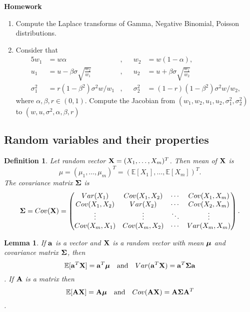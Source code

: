 \documentclass[11pt]{article}
\def\A{{\bf A}}
\def\a{{\bf a}}
\def\X{{\bf X}}
\def\BE{{\mathbb E}}
\def\muu{\mbox{\boldmath$\mu$\unboldmath}}
\def\Si{\mbox{\boldmath$\Sigma$\unboldmath}}
\newtheorem{lemma}{Lemma}[section]
\newtheorem{definition}{Definition}[section]
\begin{document}
{\bf Homework}
\begin{enumerate}
	\item Compute the Laplace transforms of Gamma, Negative Binomial, Poisson distributions.
	\item Consider that
		\begin{alignat*}{5}
			w_1		&= w\alpha					&, && w_2 &=w(1-\alpha),\\
			u_1		&= u-\beta\sigma\sqrt{\frac{w_2}{w_1}}	&, && u_2 &=  u+\beta\sigma\sqrt{\frac{w_1}{w_2}}\\
			\sigma_1^2 &= r(1-\beta^2)\sigma^2w/w_1	&, && \sigma_2^2 &= (1-r)(1-\beta^2)\sigma^2w/w_2,
		\end{alignat*}
		where $\alpha,\beta,r\in(0,1)$.
		Compute the Jacobian from $(w_1,w_2,u_1,u_2,\sigma_1^2,\sigma_2^2)$ to $(w,u,\sigma^2,\alpha,\beta,r)$
\end{enumerate}

\subsection{Random variables and their properties}

\begin{definition}
	Let random vector $\X=(X_1,\dots,X_m)^T$. Then mean of $\X$ is 
		$$\mu=(\mu_1,\dots,\mu_m)^T=(\BE[X_1],\dots,\BE[X_m])^T.$$
	The covariance matrix $\Si$ is
		$$\Si = Cov(\X) = 
			\begin{pmatrix}
				Var(X_1)		& Cov(X_1,X_2)	& \cdots 	& Cov(X_1,X_m)\\
				Cov(X_1,X_2)	& Var(X_2)	 	& \cdots 	& Cov(X_2,X_m)\\	
				\vdots 		& \vdots 		& \ddots 	& \vdots\\
				Cov(X_m,X_1) 	& Cov(X_m,X_2)& \cdots 	& Var(X_m,X_m)
			\end{pmatrix}.
		$$
\end{definition}

\begin{lemma}
	If $\a$ is a vector and $\X$ is a random vector with mean $\muu$ and covariance matrix $\Si$, then
		$$\BE[\a^T\X]=\a^T\muu \quad \text{and} \quad Var(\a^T\X)=\a^T\Si\a$$.
	If $\A$ is a matrix then
		$$\BE[\A\X] = \A\muu  \quad \text{and} \quad Cov(\A\X) = \A\Si\A^T$$.
\end{lemma}
\end{document}
